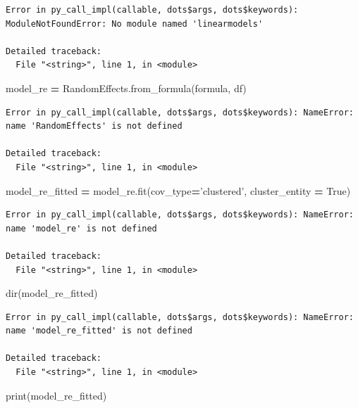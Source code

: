 \documentclass[]{book}
\newenvironment{Shaded}{\begin{snugshade}}{\end{snugshade}}
\newcommand{\BuiltInTok}[1]{#1}
\newcommand{\NormalTok}[1]{#1}
\newcommand{\OperatorTok}[1]{\textcolor[rgb]{0.81,0.36,0.00}{\textbf{#1}}}
\newcommand{\StringTok}[1]{\textcolor[rgb]{0.31,0.60,0.02}{#1}}
\newcommand{\VariableTok}[1]{\textcolor[rgb]{0.00,0.00,0.00}{#1}}
\begin{document}
\begin{verbatim}
Error in py_call_impl(callable, dots$args, dots$keywords): ModuleNotFoundError: No module named 'linearmodels'

Detailed traceback: 
  File "<string>", line 1, in <module>
\end{verbatim}

\begin{Shaded}
\begin{Highlighting}[]
\NormalTok{model_re }\OperatorTok{=}\NormalTok{ RandomEffects.from_formula(formula, df)}
\end{Highlighting}
\end{Shaded}

\begin{verbatim}
Error in py_call_impl(callable, dots$args, dots$keywords): NameError: name 'RandomEffects' is not defined

Detailed traceback: 
  File "<string>", line 1, in <module>
\end{verbatim}

\begin{Shaded}
\begin{Highlighting}[]
\NormalTok{model_re_fitted }\OperatorTok{=}\NormalTok{ model_re.fit(cov_type}\OperatorTok{=}\StringTok{'clustered'}\NormalTok{, cluster_entity }\OperatorTok{=} \VariableTok{True}\NormalTok{)}
\end{Highlighting}
\end{Shaded}

\begin{verbatim}
Error in py_call_impl(callable, dots$args, dots$keywords): NameError: name 'model_re' is not defined

Detailed traceback: 
  File "<string>", line 1, in <module>
\end{verbatim}

\begin{Shaded}
\begin{Highlighting}[]
\BuiltInTok{dir}\NormalTok{(model_re_fitted)}
\end{Highlighting}
\end{Shaded}

\begin{verbatim}
Error in py_call_impl(callable, dots$args, dots$keywords): NameError: name 'model_re_fitted' is not defined

Detailed traceback: 
  File "<string>", line 1, in <module>
\end{verbatim}

\begin{Shaded}
\begin{Highlighting}[]
\BuiltInTok{print}\NormalTok{(model_re_fitted)}
\end{Highlighting}
\end{Shaded}
\end{document}
